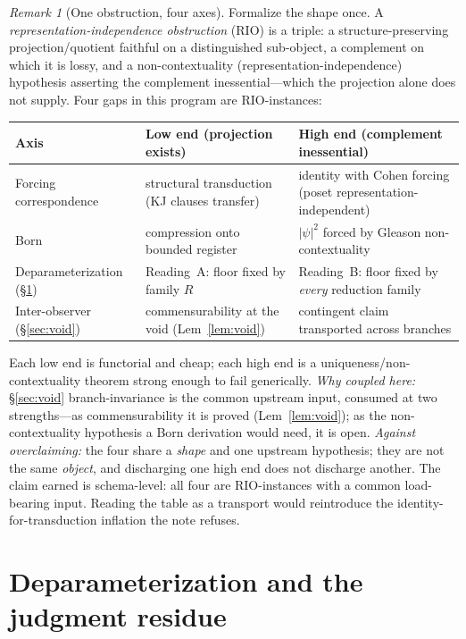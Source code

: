 \documentclass[11pt]{article}
\theoremstyle{definition}
\theoremstyle{remark}
\newtheorem*{remark}{Remark}
\begin{document}
\begin{remark}[One obstruction, four axes]
Formalize the shape once. A \emph{representation-independence obstruction} (RIO) is a triple: a
structure-preserving projection/quotient faithful on a distinguished sub-object, a complement on which
it is lossy, and a non-contextuality (representation-independence) hypothesis asserting the complement
inessential---which the projection alone does not supply. Four gaps in this program are RIO-instances:
\begin{center}
\renewcommand{\arraystretch}{1.2}
\begin{tabular}{@{}p{} p{} p{}@{}}
\toprule
\textbf{Axis} & \textbf{Low end (projection exists)} & \textbf{High end (complement inessential)}\\
\midrule
Forcing correspondence & structural transduction (KJ clauses transfer) & identity with Cohen forcing (poset representation-independent)\\
Born & compression onto bounded register & $|\psi|^2$ forced by Gleason non-contextuality\\
Deparameterization (\S\ref{sec:deparam}) & Reading~A: floor fixed by family $R$ & Reading~B: floor fixed by \emph{every} reduction family\\
Inter-observer (\S\ref{sec:void}) & commensurability at the void (Lem~\ref{lem:void}) & contingent claim transported across branches\\
\bottomrule
\end{tabular}
\end{center}
Each low end is functorial and cheap; each high end is a uniqueness/non-contextuality theorem strong
enough to fail generically. \emph{Why coupled here:} \S\ref{sec:void} branch-invariance is the common
upstream input, consumed at two strengths---as commensurability it is proved (Lem~\ref{lem:void}); as
the non-contextuality hypothesis a Born derivation would need, it is open. \emph{Against overclaiming:}
the four share a \emph{shape} and one upstream hypothesis; they are not the same \emph{object}, and
discharging one high end does not discharge another. The claim earned is schema-level: all four are
RIO-instances with a common load-bearing input. Reading the table as a transport would reintroduce the
identity-for-transduction inflation the note refuses.
\end{remark}

\section{Deparameterization and the judgment residue}\label{sec:deparam}
\end{document}
